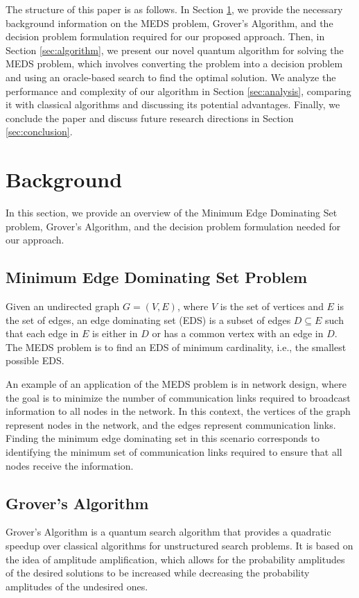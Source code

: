 The structure of this paper is as follows. In Section \ref{sec:background}, we provide the necessary background information on the MEDS problem, Grover's Algorithm, and the decision problem formulation required for our proposed approach. Then, in Section \ref{sec:algorithm}, we present our novel quantum algorithm for solving the MEDS problem, which involves converting the problem into a decision problem and using an oracle-based search to find the optimal solution. We analyze the performance and complexity of our algorithm in Section \ref{sec:analysis}, comparing it with classical algorithms and discussing its potential advantages. Finally, we conclude the paper and discuss future research directions in Section \ref{sec:conclusion}.

\section{Background} \label{sec:background}
In this section, we provide an overview of the Minimum Edge Dominating Set problem, Grover's Algorithm, and the decision problem formulation needed for our approach.

\subsection{Minimum Edge Dominating Set Problem}
Given an undirected graph $G=(V,E)$, where $V$ is the set of vertices and $E$ is the set of edges, an edge dominating set (EDS) is a subset of edges $D \subseteq E$ such that each edge in $E$ is either in $D$ or has a common vertex with an edge in $D$. The MEDS problem is to find an EDS of minimum cardinality, i.e., the smallest possible EDS.

An example of an application of the MEDS problem is in network design, where the goal is to minimize the number of communication links required to broadcast information to all nodes in the network. In this context, the vertices of the graph represent nodes in the network, and the edges represent communication links. Finding the minimum edge dominating set in this scenario corresponds to identifying the minimum set of communication links required to ensure that all nodes receive the information.

\subsection{Grover's Algorithm}
Grover's Algorithm is a quantum search algorithm that provides a quadratic speedup over classical algorithms for unstructured search problems. It is based on the idea of amplitude amplification, which allows for the probability amplitudes of the desired solutions to be increased while decreasing the probability amplitudes of the undesired ones.

